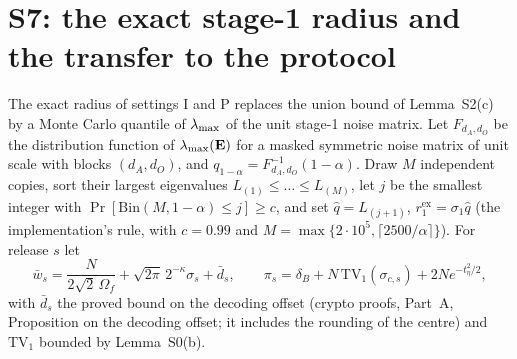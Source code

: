 \section{S7: the exact stage-1 radius and the transfer to the protocol}
\label{sec:S7}

The exact radius of settings I and P replaces the union bound of Lemma~S2(c) by a Monte Carlo quantile of $\lambda_{\max}$ of the unit stage-1 noise matrix. Let $F_{d_A,d_O}$ be the distribution function of $\lambda_{\max}(\mathbf{E})$ for a masked symmetric noise matrix of unit scale with blocks $(d_A,d_O)$, and $q_{1-\alpha}=F^{-1}_{d_A,d_O}(1-\alpha)$. Draw $M$ independent copies, sort their largest eigenvalues $L_{(1)}\le\dots\le L_{(M)}$, let $j$ be the smallest integer with $\Pr[\mathrm{Bin}(M,1-\alpha)\le j]\ge c$, and set $\hat q=L_{(j+1)}$, $r_1^{\mathrm{ex}}=\sigma_1\hat q$ (the implementation's rule, with $c=0.99$ and $M=\max\{2\cdot10^5,\lceil2500/\alpha\rceil\}$). For release $s$ let
\[
  \bar w_s=\frac{N}{2\sqrt2\,\Omega_f}+\sqrt{2\pi}\,2^{-\kappa}\sigma_s+\bar d_s,\qquad
  \pi_s=\delta_B+N\,\mathrm{TV}_1(\sigma_{c,s})+2Ne^{-t_\eta^2/2},
\]
with $\bar d_s$ the proved bound on the decoding offset (crypto proofs, Part~A, Proposition on the decoding offset; it includes the rounding of the centre) and $\mathrm{TV}_1$ bounded by Lemma~S0(b).

